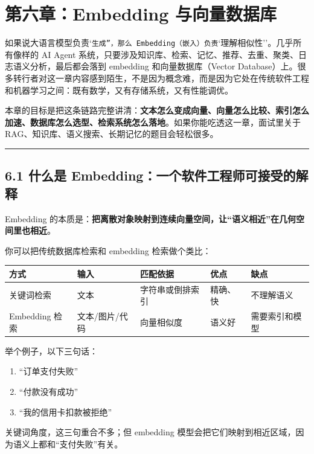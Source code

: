 \chapter{第六章：Embedding 与向量数据库}

如果说大语言模型负责`\texttt{生成''，那么 Embedding（嵌入）负责}`理解相似性''。几乎所有像样的 AI Agent 系统，只要涉及知识库、检索、记忆、推荐、去重、聚类、日志语义分析，最后都会落到 embedding 和向量数据库（Vector Database）上。很多转行者对这一章内容感到陌生，不是因为概念难，而是因为它处在传统软件工程和机器学习之间：既有数学，又有存储系统，又有性能调优。


本章的目标是把这条链路完整讲清：\textbf{文本怎么变成向量、向量怎么比较、索引怎么加速、数据库怎么选型、检索系统怎么落地}。如果你能吃透这一章，面试里关于 RAG、知识库、语义搜索、长期记忆的题目会轻松很多。


\bigskip\hrule\bigskip

\section{6.1 什么是 Embedding：一个软件工程师可接受的解释}

Embedding 的本质是：\textbf{把离散对象映射到连续向量空间，让``语义相近''在几何空间里也相近}。


你可以把传统数据库检索和 embedding 检索做个类比：


\begingroup
\scriptsize
\setlength{\tabcolsep}{3pt}
\begin{longtable}{|p{}|p{}|p{}|p{}|p{}|}
\hline
方式 & 输入 & 匹配依据 & 优点 & 缺点 \\ \hline
关键词检索 & 文本 & 字符串或倒排索引 & 精确、快 & 不理解语义 \\ \hline
Embedding 检索 & 文本/图片/代码 & 向量相似度 & 语义好 & 需要索引和模型 \\ \hline
\end{longtable}
\endgroup

举个例子，以下三句话：


\begin{enumerate}[leftmargin=2em]
\item ``订单支付失败''
\item ``付款没有成功''
\item ``我的信用卡扣款被拒绝''
\end{enumerate}

关键词角度，这三句重合不多；但 embedding 模型会把它们映射到相近区域，因为语义上都和``支付失败''有关。


